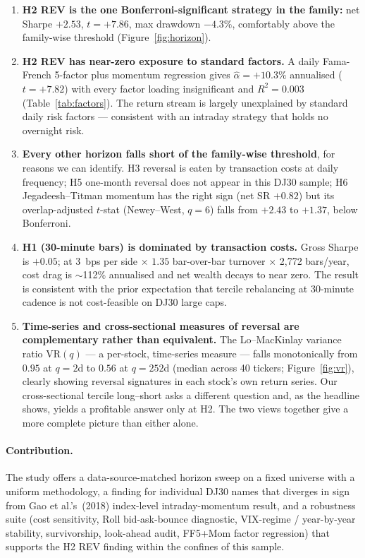 \documentclass[10pt,conference,compsoc]{IEEEtran}
\begin{document}
\begin{enumerate}[leftmargin=*]
  \item \textbf{H2 REV is the one Bonferroni-significant strategy
    in the family:} net Sharpe $+2.53$, $t = +7.86$, max drawdown
    $-4.3\%$, comfortably above the family-wise threshold
    (Figure~\ref{fig:horizon}).
  \item \textbf{H2 REV has near-zero exposure to standard factors.}
    A daily Fama-French 5-factor plus momentum regression gives
    $\hat\alpha = +10.3\%$ annualised ($t = +7.82$) with every
    factor loading insignificant and $R^{2} = 0.003$
    (Table~\ref{tab:factors}). The return stream is largely
    unexplained by standard daily risk factors --- consistent with
    an intraday strategy that holds no overnight risk.
  \item \textbf{Every other horizon falls short of the family-wise
    threshold}, for reasons we can identify. H3 reversal is
    eaten by transaction costs at daily frequency; H5 one-month
    reversal does not appear in this DJ30 sample; H6
    Jegadeesh--Titman momentum has the right sign (net SR $+0.82$)
    but its overlap-adjusted $t$-stat (Newey--West, $q{=}6$)
    falls from $+2.43$ to $+1.37$, below Bonferroni.
  \item \textbf{H1 (30-minute bars) is dominated by transaction
    costs.} Gross Sharpe is $+0.05$; at 3~bps per side
    $\times$ $1.35$ bar-over-bar turnover $\times$ 2{,}772 bars/year,
    cost drag is $\sim$112\% annualised and net wealth decays to
    near zero. The result is consistent with the prior expectation
    that tercile rebalancing at 30-minute cadence is not
    cost-feasible on DJ30 large caps.
  \item \textbf{Time-series and cross-sectional measures of
    reversal are complementary rather than equivalent.} The
    Lo--MacKinlay variance ratio $\mathrm{VR}(q)$ --- a
    per-stock, time-series measure --- falls monotonically from
    $0.95$ at $q{=}2$d to $0.56$ at $q{=}252$d (median across 40
    tickers; Figure~\ref{fig:vr}), clearly showing reversal
    signatures in each stock's own return series. Our
    cross-sectional tercile long--short asks a different question
    and, as the headline shows, yields a profitable answer only at
    H2. The two views together give a more complete picture than
    either alone.
\end{enumerate}

\paragraph{Contribution.} The study offers a data-source-matched
horizon sweep on a fixed universe with a uniform methodology, a
finding for individual DJ30 names that diverges in sign from Gao et
al.'s~(2018) index-level intraday-momentum result, and a robustness
suite (cost sensitivity, Roll bid-ask-bounce diagnostic, VIX-regime
/ year-by-year stability, survivorship, look-ahead audit, FF5+Mom
factor regression) that supports the H2 REV finding within the
confines of this sample.
\end{document}
